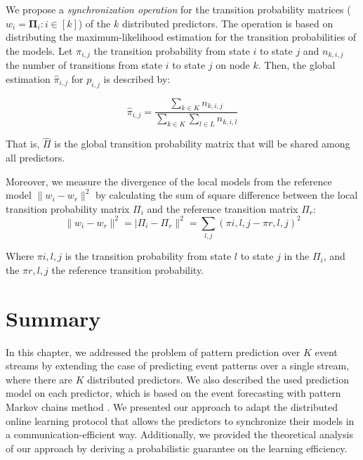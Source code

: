 \par We propose a \textit{synchronization operation} for the transition probability matrices ($w_i=\boldsymbol{\Pi}_i :i \in[k]$) of the $k$ distributed \pmcmr predictors. The operation is based on distributing the maximum-likelihood estimation \cite{anderson1957statistical} for the transition probabilities of the \pmcmr models. 
Let $\pi_{i,j}$ the transition probability from state $i$ to state $j$ 
and $n_{k,i,j}$ the number of transitions from state $i$ to state $j$ on node $k$. Then, the global estimation $\hat{\pi}_{i,j}$ for $p_{i,j}$ is described by:

\begin{equation}
\label{eq:dis_pi_estim}
\hat{\pi}_{i,j} = \frac{\sum_{k \in K} n_{k,i,j}}{\sum_{k \in K} \sum_{l \in L} n_{k,i,l}}
\end{equation}

That is,  $\hat{\Pi}$ is the global transition probability matrix that will be shared among all \pmcmr predictors. 
\par Moreover, we measure the divergence of the local models from the reference model $\|w_i - w_r\|^2$ by calculating the sum of square difference between the local transition probability matrix $\Pi_i$ and the reference transition matrix $\Pi_r$:
\begin{equation*}
\label{eq:dis_pi_varinace}
\|w_i - w_r\|^2=|\Pi_i - \Pi_r\|^2=\sum_{l,j} (\pi{i,l,j} -\pi{r,l,j})^2
\end{equation*}

Where $\pi{i,l,j}$ is the transition probability from state $l$ to state $j$ in the $\Pi_i$, and the $\pi{r,l,j}$ the reference transition probability.



\section{Summary}

\par In this chapter, we addressed the problem of pattern prediction over \emph{$K$} event streams by extending the case of predicting  event patterns over a single stream, where there are \emph{$K$} distributed predictors.  We also described the used prediction model on each predictor, which is based on the event forecasting with pattern Markov chains method \cite{alevizos2017event}. We presented our approach to adapt the distributed online learning protocol \cite{kamp2014communication} that allows the predictors to synchronize their models in a communication-efficient way. Additionally, we provided the theoretical analysis of our approach by deriving a
 probabilistic guarantee on the learning efficiency. 
 
